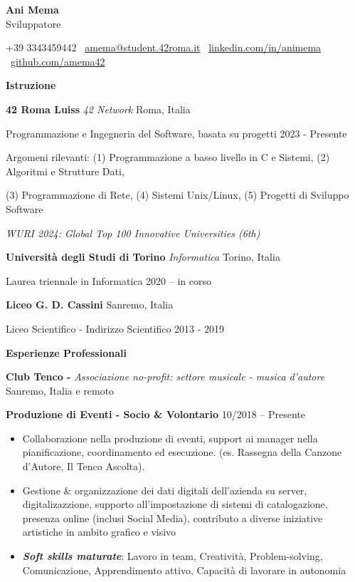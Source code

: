 \documentclass[11pt]{article}
\begin{document}
\begin{center}
    \textbf{Ani Mema}\\ 
    Sviluppatore
\end{center}

\begin{center}
+39 3343459442 \textbullet \ \href{mailto:amema@student.42roma.it}{amema@student.42roma.it} \textbullet \ \href{https://www.linkedin.com/in/animema/}{linkedin.com/in/animema} \textbullet \ \href{https://github.com/amema42}{github.com/amema42}
\end{center}

\begin{center}
    \textbf{Istruzione}
\end{center}
\textbf{42 Roma Luiss} \textit{42 Network} \hfill Roma, Italia

Programmazione e Ingegneria del Software, basata su progetti \hfill 2023 - Presente

Argomeni rilevanti: (1) Programmazione a basso livello in C e Sistemi, (2) Algoritmi e Strutture Dati,

(3) Programmazione di Rete, (4) Sistemi Unix/Linux, (5) Progetti di Sviluppo Software

\textit{WURI 2024: Global Top 100 Innovative Universities (6th)
}
\vspace{12pt}

\textbf{Università degli Studi di Torino} \textit{Informatica} \hfill Torino, Italia

Laurea triennale in Informatica \hfill	2020 – in corso

\vspace{12pt}

\textbf{Liceo G. D. Cassini} \hfill	Sanremo, Italia

Liceo Scientifico - Indirizzo Scientifico \hfill 2013 - 2019

\vspace{12pt}

\begin{center}
    \textbf{Esperienze Professionali}
\end{center}
\textbf{Club Tenco -} \textit{Associazione no-profit: settore musicale - musica d'autore} \hfill Sanremo, Italia e remoto

\textbf{Produzione di Eventi - Socio \& Volontario} \hfill 10/2018 – Presente

\begin{itemize}[noitemsep, topsep=0pt, partopsep=0pt, parsep=0pt]
    \item Collaborazione nella produzione di eventi, support ai manager nella pianificazione, coordinamento ed esecuzione. (es. Rassegna della Canzone d'Autore, Il Tenco Ascolta).
    \item Gestione \& organizzazione dei dati digitali dell'azienda su server, digitalizazzione, supporto all'impostazione di sistemi di catalogazione, presenza online (inclusi Social Media), contributo a diverse iniziative artistiche in ambito grafico e visivo
    \item \textit{\textbf{Soft skills maturate}}: Lavoro in team, Creatività, Problem-solving, Comunicazione, Apprendimento attivo, Capacità di lavorare in autonomia
\end{itemize}
\end{document}
